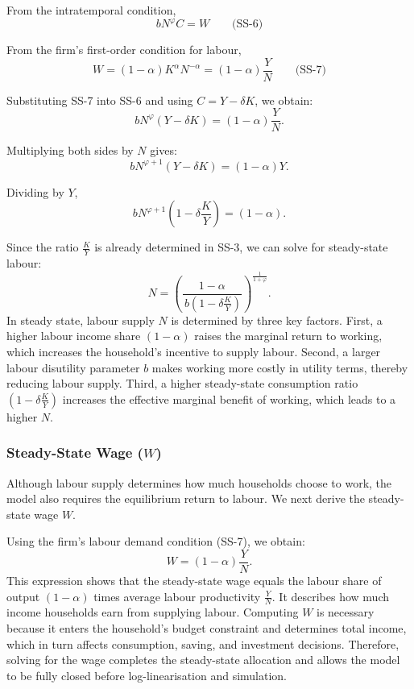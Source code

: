 \documentclass[12pt]{article}
\begin{document}
From the intratemporal condition,
\[
b N^{\varphi} C = W \qquad \text{(SS-6)}
\]

From the firm's first-order condition for labour,
\[
W = (1-\alpha) K^{\alpha} N^{-\alpha} = (1-\alpha)\frac{Y}{N} 
\qquad \text{(SS-7)}
\]

Substituting SS-7 into SS-6 and using $C = Y - \delta K$, we obtain:
\[
b N^{\varphi}(Y - \delta K) = (1-\alpha)\frac{Y}{N}.
\]

Multiplying both sides by $N$ gives:
\[
b N^{\varphi+1}(Y - \delta K) = (1-\alpha)Y.
\]

Dividing by $Y$,
\[
b N^{\varphi+1}\left(1 - \delta \frac{K}{Y}\right) = (1-\alpha).
\]

Since the ratio $\frac{K}{Y}$ is already determined in SS-3, we can solve for steady-state labour:
\[
N = \left(
\frac{1-\alpha}{\,b\left(1 - \delta \frac{K}{Y}\right)}
\right)^{\frac{1}{1+\varphi}}.
\tag{26}
\]
In steady state, labour supply $N$ is determined by three key factors. 
First, a higher labour income share $(1-\alpha)$ raises the marginal return to working, which increases the household’s incentive to supply labour. 
Second, a larger labour disutility parameter $b$ makes working more costly in utility terms, thereby reducing labour supply. 
Third, a higher steady-state consumption ratio $(1-\delta \frac{K}{Y})$ increases the effective marginal benefit of working, which leads to a higher $N$. 

\subsubsection{Steady-State Wage ($W$)}
Although labour supply determines how much households choose to work, the model also requires the equilibrium return to labour.
We next derive the steady-state wage $W$.

Using the firm's labour demand condition (SS-7), we obtain:
\[
W = (1-\alpha)\frac{Y}{N}.
\tag{27}
\]
This expression shows that the steady-state wage equals the labour share of output $(1-\alpha)$ times average labour productivity $\frac{Y}{N}$. It describes how much income households earn from supplying labour. Computing $W$ is necessary because it enters the household’s budget constraint and determines total income, which in turn affects consumption, saving, and investment decisions. Therefore, solving for the wage completes the steady-state allocation and allows the model to be fully closed before log-linearisation and simulation.


% 
\end{document}
